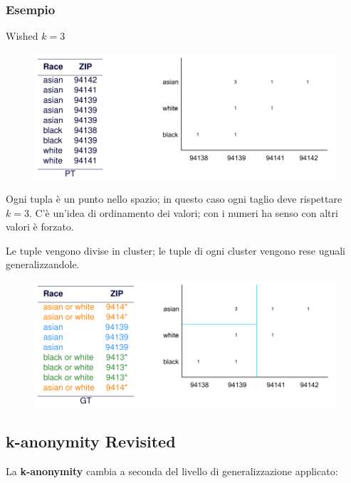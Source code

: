 \documentclass{report}
\begin{document}
\subsubsection{Esempio}
Wished $k = 3$
\begin{figure}[ht]
    \centering
    \includegraphics[width=1\linewidth]{images/mondrian1.png}
\end{figure}

\noindent Ogni tupla è un punto nello spazio; in questo caso ogni taglio deve rispettare $k=3$.
C'è un'idea di ordinamento dei valori; con i numeri ha senso con altri valori è forzato.

Le tuple vengono divise in cluster; le tuple di ogni cluster vengono rese uguali generalizzandole.

\begin{figure}[ht]
    \centering
    \includegraphics[width=1\linewidth]{images/mondrian2.png}
\end{figure}

\subsection{k-anonymity Revisited}
La \textbf{k-anonymity} cambia a seconda del livello di generalizzazione applicato:
\end{document}
